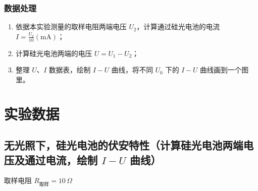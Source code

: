 \documentclass[11pt]{article}
\begin{document}
\subsubsection{数据处理}
\begin{enumerate}
    \item 依据本实验测量的取样电阻两端电压 $U_2$，计算通过硅光电池的电流 $I = \frac{U_2}{10}(\text{mA})$；
    \item 计算硅光电池两端的电压 $U = U_1 - U_2$；
    \item 整理 $U$、$I$ 数据表，绘制 $I - U$ 曲线，将不同 $U_0$ 下的 $I - U$ 曲线画到一个图里。
\end{enumerate}

\section{实验数据}
\subsection{无光照下，硅光电池的伏安特性（计算硅光电池两端电压及通过电流，绘制 $I-U$ 曲线）}

取样电阻 $R_{\text{取样}} = 10\,\Omega$
\end{document}

